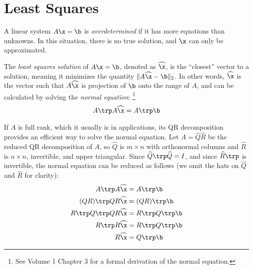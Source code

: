 \label{lab:qr-applications}

\section*{Least Squares} %

A linear system $A\x = \b$ is \emph{overdetermined} if it has more equations than unknowns.
In this situation, there is no true solution, and $\x$ can only be approximated.

The \emph{least squares solution} of $A\x = \b$, denoted as $\widehat{\x}$, is the ``closest'' vector to a solution, meaning it minimizes the quantity $\|A\widehat{\x} - \b\|_2$.
In other words, $\widehat{\x}$ is the vector such that $A\widehat{\x}$ is projection of $\b$ onto the range of $A$, and can be calculated by solving the \emph{normal equation}:%
\footnote{See Volume 1 Chapter 3 for a formal derivation of the normal equation.}
\[A\trp A\widehat{\x} = A\trp \b\]

If $A$ is full rank, which it usually is in applications, its QR decomposition provides an efficient way to solve the normal equation.
Let $A = \widehat{Q}\widehat{R}$ be the reduced QR decomposition of $A$, so $\widehat{Q}$ is $m \times n$ with orthonormal columns and $\widehat{R}$ is $n \times n$, invertible, and upper triangular.
Since $\widehat{Q}\trp \widehat{Q} = I$, and since $\widehat{R}\trp$ is invertible, the normal equation can be reduced as follows (we omit the hats on $\widehat{Q}$ and $\widehat{R}$ for clarity):
%
\begin{align}
\nonumber
A\trp A\widehat{\x} &= A\trp \b \\ \nonumber
(Q R)\trp Q R  \widehat{\x}
&= (Q R)\trp \b \\ \nonumber
 R\trp Q\trp Q R  \widehat{\x}
&=  R\trp Q\trp \b \\ \nonumber
 R\trp R \widehat{\x}
&=  R\trp Q\trp \b \\
 R \widehat{\x}
&= Q\trp \b \label{eq:normal-equation-via-qr}
\end{align}

